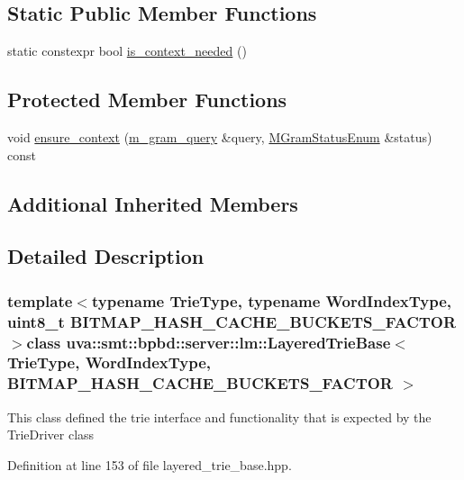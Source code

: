\subsection*{Static Public Member Functions}
\begin{DoxyCompactItemize}
\item 
static constexpr bool \hyperlink{classuva_1_1smt_1_1bpbd_1_1server_1_1lm_1_1_layered_trie_base_aa19d5d42465e3be9e410092a02822e31}{is\+\_\+context\+\_\+needed} ()
\end{DoxyCompactItemize}
\subsection*{Protected Member Functions}
\begin{DoxyCompactItemize}
\item 
void \hyperlink{classuva_1_1smt_1_1bpbd_1_1server_1_1lm_1_1_layered_trie_base_aec825fdca751b5c4739940e9494cf7c5}{ensure\+\_\+context} (\hyperlink{classuva_1_1smt_1_1bpbd_1_1server_1_1lm_1_1m__gram__query}{m\+\_\+gram\+\_\+query} \&query, \hyperlink{namespaceuva_1_1smt_1_1bpbd_1_1server_1_1lm_ab9b3e7382b561dcb8abcd6b55e9b796a}{M\+Gram\+Status\+Enum} \&status) const 
\end{DoxyCompactItemize}
\subsection*{Additional Inherited Members}


\subsection{Detailed Description}
\subsubsection*{template$<$typename Trie\+Type, typename Word\+Index\+Type, uint8\+\_\+t B\+I\+T\+M\+A\+P\+\_\+\+H\+A\+S\+H\+\_\+\+C\+A\+C\+H\+E\+\_\+\+B\+U\+C\+K\+E\+T\+S\+\_\+\+F\+A\+C\+T\+O\+R$>$class uva\+::smt\+::bpbd\+::server\+::lm\+::\+Layered\+Trie\+Base$<$ Trie\+Type, Word\+Index\+Type, B\+I\+T\+M\+A\+P\+\_\+\+H\+A\+S\+H\+\_\+\+C\+A\+C\+H\+E\+\_\+\+B\+U\+C\+K\+E\+T\+S\+\_\+\+F\+A\+C\+T\+O\+R $>$}

This class defined the trie interface and functionality that is expected by the Trie\+Driver class 

Definition at line 153 of file layered\+\_\+trie\+\_\+base.\+hpp.



